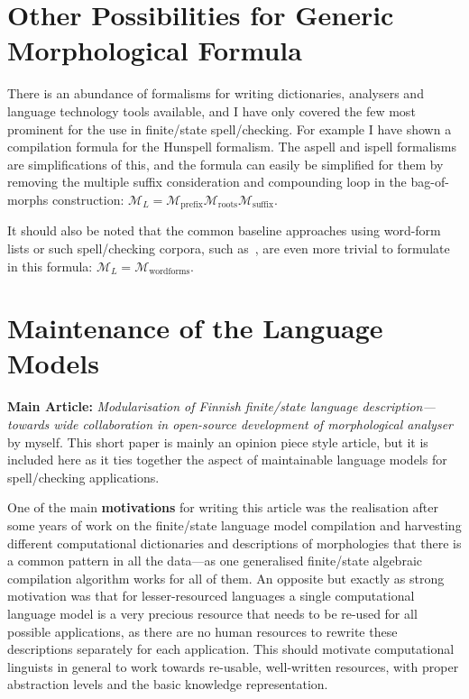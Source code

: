 \documentclass[officiallayout]{unihelcompling}
\begin{document}
\section{Other Possibilities for Generic Morphological Formula}
\label{sec:other-lms}

There is an abundance of formalisms for writing dictionaries, analysers and
language technology tools available, and I have only covered the few most
prominent for the use in finite\-/state spell\-/checking. For example I have
shown a compilation formula for the Hunspell formalism. The aspell and ispell
formalisms are simplifications of this, and the formula can easily be
simplified for them by removing the multiple suffix consideration and
compounding loop in the bag-of-morphs construction: $\mathcal{M}_L =
\mathcal{M}_\mathrm{prefix} \mathcal{M}_\mathrm{roots} \mathcal{M}_\mathrm{suffix}$.

It should also be noted that the common baseline approaches using word-form
lists or such spell\-/checking corpora, such as~\citet{norvig2010howto}, are even
more trivial to formulate in this formula: $\mathcal{M}_L =
\mathcal{M}_\mathrm{wordforms}$.

\section{Maintenance of the Language Models}
\label{sec:maintenance}

\textbf{Main Article:} \emph{Modularisation of Finnish finite\-/state language 
description—towards wide collaboration in open-source development of
morphological analyser} by myself. This short paper is mainly an opinion
piece style article, but it is included here as it ties together the
aspect of maintainable language models for spell\-/checking applications.

One of the main \textbf{motivations} for writing this article was the
realisation after some years of work on the finite\-/state language model
compilation and harvesting different computational dictionaries and
descriptions of morphologies that there is a common pattern in all the
data---as one generalised finite\-/state algebraic compilation algorithm works
for all of them. An opposite but exactly as strong motivation was that for
lesser-resourced languages a single computational language model is a very
precious resource that needs to be re-used for all possible applications, as
there are no human resources to rewrite these descriptions separately for each
application. This should motivate computational linguists in general to work
towards re-usable, well-written resources, with proper abstraction levels and
the basic knowledge representation.
\end{document}
